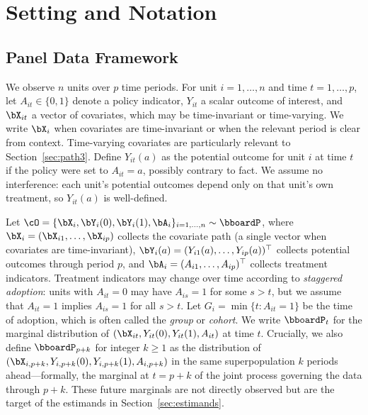 \documentclass{article}
\renewcommand{\P}{\bboardP}
\begin{document}
\section{Setting and Notation}
\label{sec:setting}


\subsection{Panel Data Framework}


We observe $n$ units over $p$ time periods. For unit $i = 1, \ldots, n$ and time $t = 1, \ldots, p$, let $A_{it} \in \{0,1\}$ denote a policy indicator, $Y_{it}$ a scalar outcome of interest, and $\bX_{it}$ a vector of covariates, which may be time-invariant or time-varying. We write $\bX_i$ when covariates are time-invariant or when the relevant period is clear from context. Time-varying covariates are particularly relevant to Section~\ref{sec:path3}. Define $Y_{it}(a)$ as the potential outcome for unit $i$ at time $t$ if the policy were set to $A_{it} = a$, possibly contrary to fact. We assume no interference: each unit's potential outcomes depend only on that unit's own treatment, so $Y_{it}(a)$ is well-defined.

Let $\cO = \{\bX_{i}, \bY_{i}(0), \bY_{i}(1), \bA_{i}\}_{i = 1, \ldots, n} \sim \P$, where $\bX_i = (\bX_{i1}, \ldots, \bX_{ip})$ collects the covariate path (a single vector when covariates are time-invariant), $\bY_i(a) = (Y_{i1}(a), \ldots, Y_{ip}(a))^\top$ collects potential outcomes through period $p$, and $\bA_i = (A_{i1}, \ldots, A_{ip})^\top$ collects treatment indicators. Treatment indicators may change over time according to \textit{staggered adoption}: units with $A_{it} = 0$ may have $A_{is} = 1$ for some $s > t$, but we assume that $A_{it} = 1$ implies $A_{is} = 1$ for all $s > t$. Let $G_i = \min\{t : A_{it} = 1\}$ be the time of adoption, which is often called the \textit{group} or \textit{cohort}. We write $\P_t$ for the marginal distribution of $(\bX_{it}, Y_{it}(0), Y_{it}(1), A_{it})$ at time $t$. Crucially, we also define $\P_{p+k}$ for integer $k \geq 1$ as the distribution of $(\bX_{i,p+k}, Y_{i,p+k}(0), Y_{i,p+k}(1), A_{i,p+k})$ in the same superpopulation $k$ periods ahead---formally, the marginal at $t = p+k$ of the joint process governing the data through $p+k$. These future marginals are not directly observed but are the target of the estimands in Section~\ref{sec:estimands}.
\end{document}
